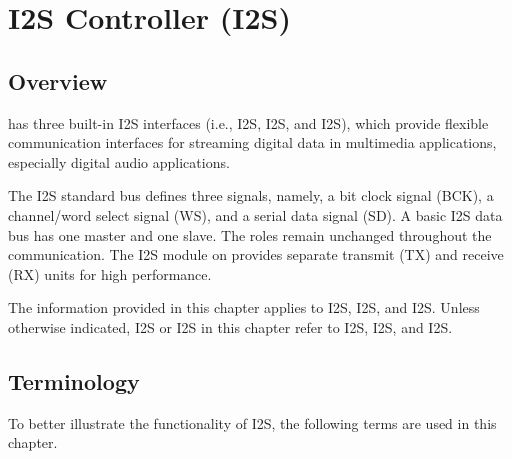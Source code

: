 \documentclass[main\_\_EN.tex]{subfiles}
\begin{document}

\ifglobal
\else
    {\let\clearpage\relax \listoftodos}
    {\let\clearpage\relax \listofdonetodos}
    \tableofcontents
\fi



\hypertarget{i2s}{}
\chapter{I2S Controller (I2S)}
\label{mod:i2s}

\section{Overview}

\chipname{} has three built-in I2S interfaces (i.e., I2S, I2S, and I2S), which provide flexible communication interfaces for streaming digital data in multimedia applications, especially digital audio applications.

The I2S standard bus defines three signals, namely, a bit clock signal (BCK), a channel/word select signal (WS), and a serial data signal (SD). A basic I2S data bus has one master and one slave. The roles remain unchanged throughout the communication. The I2S module on \chipname{} provides separate transmit (TX) and receive (RX) units for high performance.

\begin{tiplisting}
The information provided in this chapter applies to I2S, I2S, and I2S. Unless otherwise indicated, I2S or I2S in this chapter refer to I2S, I2S, and I2S.
\end{tiplisting}

\section{Terminology}
\label{sec:i2s-term}

To better illustrate the functionality of I2S, the following terms are used in this chapter. 
\end{document}
